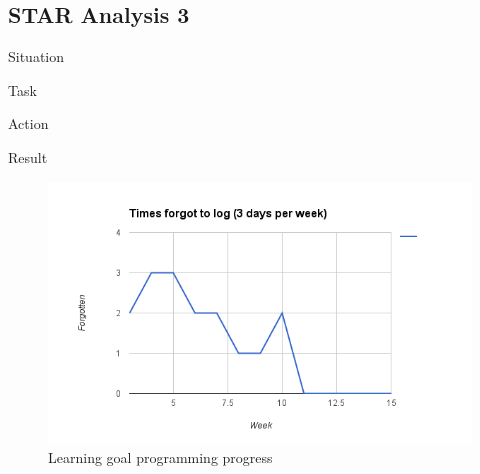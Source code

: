 \documentclass[12pt]{article}
\begin{document}
	\subsection{STAR Analysis 3}
	\begin{STAR}
	    \item[Situation]
	    \item[Task]
	    \item[Action]
	    \item[Result]
	\end{STAR}
	
	\begin{figure}[ht]
		\centering
		\includegraphics[width=\textwidth, keepaspectratio=true]{personaldossiers/LearningGoalLoggingMartijn.png}
		\caption{Learning goal programming progress}\label{lglogging}
	\end{figure}
	
	
	
	
\end{document}
